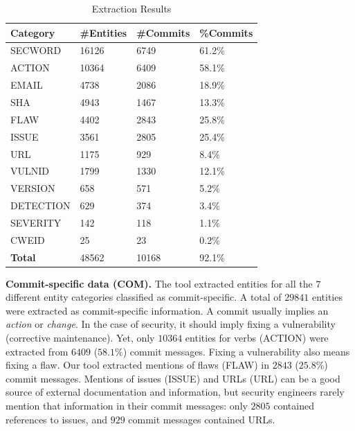 \begin{table}[t!]
\footnotesize
    \centering
        \caption{Extraction Results} 
    \begin{tabular}{| p{2cm} | p{1.25cm} | p{1.5cm} | p{1.5cm} | }
    \hline
        \textbf{Category} & \textbf{\#Entities} & \textbf{\#Commits} & \textbf{\%Commits} \\\hline
SECWORD & 16126 & 6749 & 61.2\%\\\hline
ACTION & 10364 & 6409 & 58.1\%\\\hline
EMAIL & 4738 & 2086 & 18.9\%\\\hline
SHA & 4943 & 1467 & 13.3\%\\\hline
FLAW & 4402 & 2843 & 25.8\%\\\hline
ISSUE & 3561 & 2805 & 25.4\%\\\hline
URL & 1175 & 929 & 8.4\%\\\hline
VULNID & 1799 & 1330 & 12.1\%\\\hline
VERSION & 658 & 571 & 5.2\%\\\hline
DETECTION & 629 & 374 & 3.4\%\\\hline
SEVERITY & 142 & 118 & 1.1\%\\\hline
CWEID & 25 & 23 & 0.2\%\\\hline\hline
\textbf{Total} & 48562 & 10168 & 92.1\%\\\hline
\end{tabular}
    \label{tab:entities}
\end{table}

\textbf{Commit-specific data (COM).} The tool extracted entities for all the $7$ different entity categories classified as commit-specific. A total of $29841$ entities were extracted as commit-specific information. 
A commit usually implies an \emph{action} or \emph{change}. In the case of security, it should imply fixing a vulnerability (corrective maintenance). Yet, only $10364$ entities for verbs (ACTION) were extracted from $6409$ ($58.1\%$) commit messages. Fixing a vulnerability also means fixing a flaw. Our tool extracted mentions of flaws (FLAW) in $2843$ ($25.8\%$) commit messages. 
Mentions of issues (ISSUE) and URLs (URL) can be a good source of external documentation and information, but security engineers rarely mention that information in their commit messages: only $2805$ contained references to issues, and $929$ commit messages contained URLs. 

